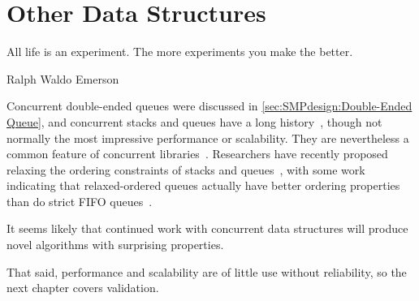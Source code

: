 \section{Other Data Structures}
\label{sec:skiplist:Other Data Structures}
%
\epigraph{All life is an experiment.
	  The more experiments you make the better.}
	 {Ralph Waldo Emerson}

Concurrent double-ended queues were discussed in
\cref{sec:SMPdesign:Double-Ended Queue},
and concurrent stacks and queues have a long history~\cite{Treiber86},
though not normally the most impressive performance or scalability.
They are nevertheless a common feature of concurrent
libraries~\cite{PaulMcKenney2013LWNURCUqueuestack}.
Researchers have recently proposed relaxing the ordering constraints
of stacks and queues~\cite{Shavit:2011:DSM:1897852.1897873},
with some work indicating that relaxed-ordered queues actually have
better ordering properties than do strict FIFO
queues~\cite{AndreasHaas2012FIFOisnt,ChristophMKirsch2012FIFOisntTR,AndreasHaas2013CFRelaxedQueues}.

It seems likely that continued work with concurrent data structures will
produce novel algorithms with surprising properties.

That said, performance and scalability are of little use without reliability,
so the next chapter covers validation.

